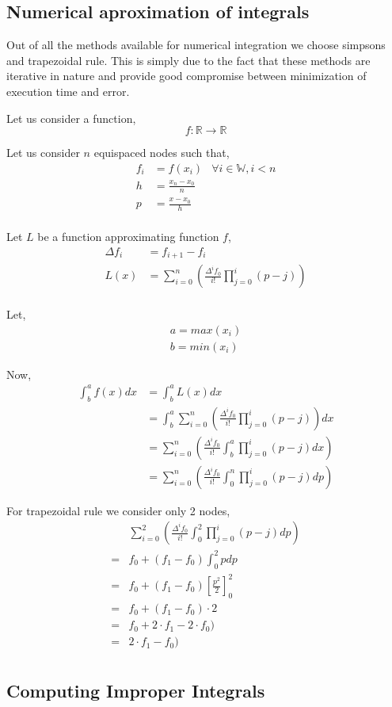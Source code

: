 \documentclass{article}
\begin{document}
\subsection*{Numerical aproximation of integrals}

Out of all the methods available for numerical integration we choose simpsons and trapezoidal rule. This is
simply due to the fact that these methods are iterative in nature and provide good compromise between minimization
of execution time and error.

Let us consider a function,
\begin{equation*}
f : \mathbb{R} \rightarrow \mathbb{R}
\end{equation*}

Let us consider $n$ equispaced nodes such that,
\begin{align*}
f_i &= f(x_i) &\forall i \in \mathbb{W}, i < n\\
h &= \frac{x_n - x_0}{n}\\
p &= \frac{x - x_0}{h}\\
\end{align*}

Let $L$ be a function approximating function $f$,
\begin{align*}
\Delta f_i &= f_{i+1} - f_{i}\\
L(x) &= \sum_{i = 0}^n \left( \frac{\Delta^i f_0}{i!} \prod_{j = 0}^i (p - j)  \right)\\
\end{align*}


Let,
\begin{align*}
a = max \left( x_i \right)\\
b = min \left( x_i \right)
\end{align*}

Now,
\begin{align*}
\int^a_b f(x) dx &= \int^a_b L(x) dx\\
&= \int^a_b \sum_{i = 0}^n \left( \frac{\Delta^i f_0}{i!} \prod_{j = 0}^i (p - j)  \right) dx\\
&= \sum_{i = 0}^n \left( \frac{\Delta^i f_0}{i!} \int^a_b \prod_{j = 0}^i (p - j) dx \right)\\
&= \sum_{i = 0}^n \left( \frac{\Delta^i f_0}{i!} \int^n_0 \prod_{j = 0}^i (p - j) dp \right)
\end{align*}

For trapezoidal rule we consider only 2 nodes,
\begin{align*}
&\sum_{i = 0}^2 \left( \frac{\Delta^i f_0}{i!} \int^2_0 \prod_{j = 0}^i (p - j) dp \right)\\
=& f_0 + (f_1 - f_0) \int^2_0 p dp\\
=& f_0 + (f_1 - f_0) \left[ \frac{p^2}{2} \right]_0^2\\
=& f_0 + (f_1 - f_0) \cdot 2\\
=& f_0 + 2 \cdot f_1 - 2 \cdot f_0)\\
=& 2 \cdot f_1 - f_0)\\
\end{align*}

\subsection*{Computing Improper Integrals}
\end{document}
